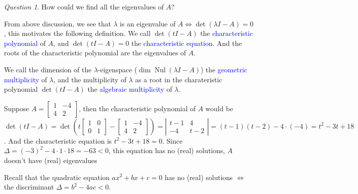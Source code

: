 \documentclass{beamer}
\DeclareMathOperator{\Nul}{Nul}
\theoremstyle{definition}
\theoremstyle{remark}
\newtheorem*{question}{Question}
\begin{document}
\begin{frame}[t]
\begin{question}
How could we find all the eigenvalues of $A$?
\end{question}
\pause
\begin{definition}
From above discussion, we see that $\lambda$ is an eigenvalue of $A\iff\det(\lambda I-A)=0$, this motivates the following definition. We call $\det(tI-A)$ the \textcolor{blue}{characteristic polynomial} of $A$, and $\det(tI-A)=0$ the \textcolor{blue}{characteristic equation}. And the roots of the characteristic polynomial are the eigenvalues of $A$.
\end{definition}
\pause
\begin{definition}
We call the dimension of the $\lambda$-eigenspace ($\dim\Nul(\lambda I-A)$) the \textcolor{blue}{geometric multiplicity} of $\lambda$, and the multiplicity of $\lambda$ as a root in the charateristic polynomial $\det(tI-A)$ the \textcolor{blue}{algebraic multiplicity} of $\lambda$.
\end{definition}
\end{frame}

\begin{frame}[t]
\begin{example}
Suppose $A=\begin{bmatrix}
1&-4\\4&2
\end{bmatrix}$, then the characteristic polynomial of $A$ would be\pause $\det(tI-A)=\det\left(t\begin{bmatrix}
1&0\\0&1
\end{bmatrix}-\begin{bmatrix}
1&-4\\4&2
\end{bmatrix}\right)=\left|\begin{matrix}
t-1&4\\-4&t-2
\end{matrix}\right|=(t-1)(t-2)-4\cdot(-4)=t^2-3t+18$\pause.
And the characteristic equation is $t^2-3t+18=0$\pause. Since $\Delta=(-3)^2-4\cdot1\cdot18=-63<0$, this equation has no (real) solutions, $A$ doesn't have (real) eigenvalues
\end{example}
\pause
Recall that the quadratic equation $ax^2+bx+c=0$ has no (real) solutions $\iff$ the discriminant $\Delta=b^2-4ac<0$.
\end{frame}
\end{document}
